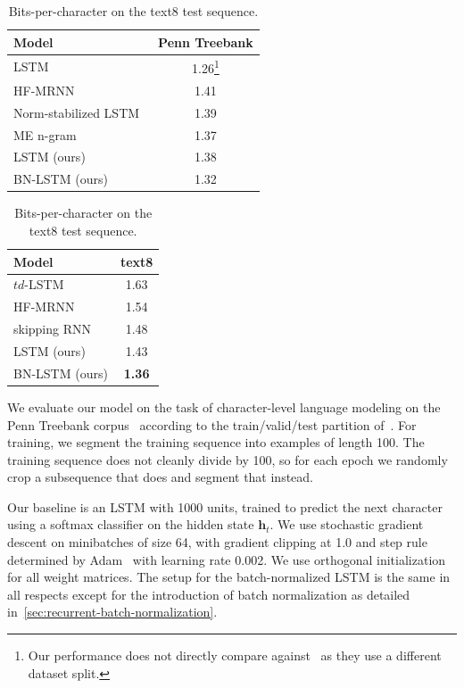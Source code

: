\documentclass{article} %
\newcommand{\vect}[1]{\mathbf{#1}}
\begin{document}
\begin{table}[!hb]
  \center
\begin{minipage}[t]{6.5cm}
\begin{tabular}{@{}lc@{}}
  \toprule
  \bf Model & \bf Penn Treebank \\
  \midrule
  LSTM~\citep{graves2013generating} &  1.26\footnote{Our performance does not directly compare against~\citep{graves2013generating} as they use a different dataset split.}\\
  \midrule
  HF-MRNN~\citep{mikolov2012subword} & 1.41 \\
  Norm-stabilized LSTM~\citep{krueger} & 1.39 \\
  ME n-gram~\citep{mikolov2012subword} & 1.37 \\
  \midrule
  LSTM (ours) & 1.38 \\
  BN-LSTM (ours) & 1.32 \\
  \bottomrule
\end{tabular}
\caption{Bits-per-character on the Penn Treebank test sequence.}
\label{tab:ptb_test}
\end{minipage}
\hspace{1cm}
\begin{minipage}[t]{4.5cm}
  \begin{tabular}{@{}lc@{}}
  \toprule
  \bf Model & \bf text8 \\
  \midrule
  $td$-LSTM~\citep{zhang2016architectural} & 1.63 \\
  HF-MRNN~\citep{mikolov2012subword} & 1.54 \\
  skipping RNN~\citep{pachitariu2013regularization} & 1.48 \\
  \midrule
  LSTM (ours) &  1.43 \\
  BN-LSTM (ours) & \textbf{1.36} \\
  \bottomrule
\end{tabular}
\caption{Bits-per-character on the text8 test sequence.}
\label{tab:text8_test}
\end{minipage}
\end{table}


We evaluate our model on the task of character-level language modeling on the Penn Treebank corpus~\citep{penntreebank}
according to the train/valid/test partition of~\citet{mikolov2012subword}.
For training, we segment the training sequence into examples of length 100.
The training sequence does not cleanly divide by 100, so for each epoch we randomly crop a subsequence that does and segment that instead.

Our baseline is an LSTM with 1000 units, trained to predict the next character using a softmax classifier on the hidden state $\vect{h}_t$.
We use stochastic gradient descent on minibatches of size 64,
with gradient clipping at 1.0 and step rule determined by Adam~\citep{kingma2014adam}
with learning rate 0.002.
We use orthogonal initialization for all weight matrices.
The setup for the batch-normalized LSTM is the same in all respects except for the introduction of batch normalization as detailed in~\ref{sec:recurrent-batch-normalization}.
\end{document}
